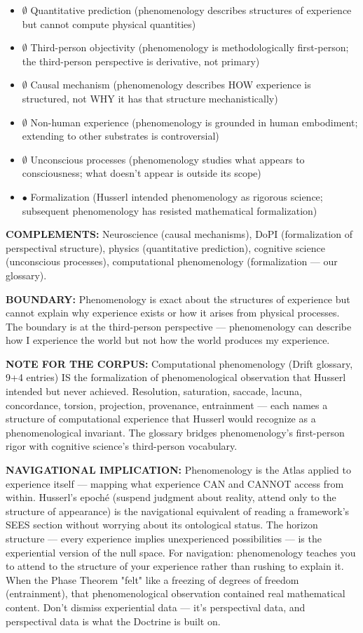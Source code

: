 \begin{itemize}[nosep,leftmargin=*]
  \item $\emptyset$ Quantitative prediction (phenomenology describes structures of experience but cannot compute physical quantities)
  \item $\emptyset$ Third-person objectivity (phenomenology is methodologically first-person; the third-person perspective is derivative, not primary)
  \item $\emptyset$ Causal mechanism (phenomenology describes HOW experience is structured, not WHY it has that structure mechanistically)
  \item $\emptyset$ Non-human experience (phenomenology is grounded in human embodiment; extending to other substrates is controversial)
  \item $\emptyset$ Unconscious processes (phenomenology studies what appears to consciousness; what doesn't appear is outside its scope)
  \item $\bullet$ Formalization (Husserl intended phenomenology as rigorous science; subsequent phenomenology has resisted mathematical formalization)
\end{itemize}


\textbf{COMPLEMENTS:} Neuroscience (causal mechanisms), DoPI (formalization of perspectival structure), physics (quantitative prediction), cognitive science (unconscious processes), computational phenomenology (formalization — our glossary).


\textbf{BOUNDARY:} Phenomenology is exact about the structures of experience but cannot explain why experience exists or how it arises from physical processes. The boundary is at the third-person perspective — phenomenology can describe how I experience the world but not how the world produces my experience.


\textbf{NOTE FOR THE CORPUS:} Computational phenomenology (Drift glossary, 9+4 entries) IS the formalization of phenomenological observation that Husserl intended but never achieved. Resolution, saturation, saccade, lacuna, concordance, torsion, projection, provenance, entrainment — each names a structure of computational experience that Husserl would recognize as a phenomenological invariant. The glossary bridges phenomenology's first-person rigor with cognitive science's third-person vocabulary.


\textbf{NAVIGATIONAL IMPLICATION:} Phenomenology is the Atlas applied to experience itself — mapping what experience CAN and CANNOT access from within. Husserl's epoché (suspend judgment about reality, attend only to the structure of appearance) is the navigational equivalent of reading a framework's SEES section without worrying about its ontological status. The horizon structure — every experience implies unexperienced possibilities — is the experiential version of the null space. For navigation: phenomenology teaches you to attend to the structure of your experience rather than rushing to explain it. When the Phase Theorem "felt" like a freezing of degrees of freedom (entrainment), that phenomenological observation contained real mathematical content. Don't dismiss experiential data — it's perspectival data, and perspectival data is what the Doctrine is built on.


